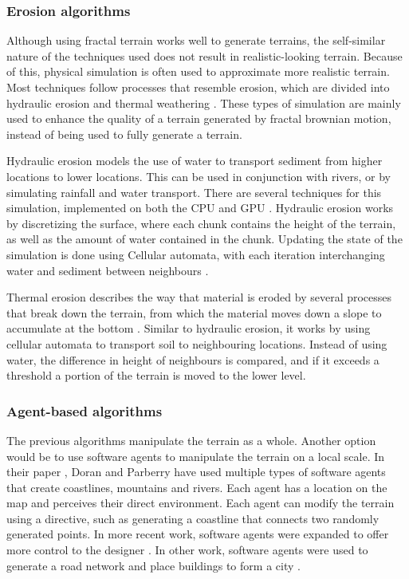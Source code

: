 \documentclass{article}
\begin{document}
\subsubsection{Erosion algorithms}
Although using fractal terrain works well to generate terrains, the self-similar nature of the techniques used does not result in realistic-looking terrain. Because of this, physical simulation is often used to approximate more realistic terrain. Most techniques follow processes that resemble erosion, which are divided into hydraulic erosion and thermal weathering \cite{musgrave_synthesis_1989}. These types of simulation are mainly used to enhance the quality of a terrain generated by fractal brownian motion, instead of being used to fully generate a terrain.

Hydraulic erosion models the use of water to transport sediment from higher locations to lower locations. This can be used in conjunction with rivers, or by simulating rainfall and water transport. There are several techniques for this simulation, implemented on both the CPU and GPU \cite{benes_visual_2002} \cite{stava_interactive_nodate}. Hydraulic erosion works by discretizing the surface, where each chunk contains the height of the terrain, as well as the amount of water contained in the chunk. Updating the state of the simulation is done using Cellular automata, with each iteration interchanging water and sediment between neighbours \cite{dambrosio_cellular_2001}.

Thermal erosion describes the way that material is eroded by several processes that break down the terrain, from which the material moves down a slope to accumulate at the bottom \cite{musgrave_synthesis_1989}. Similar to hydraulic erosion, it works by using cellular automata to transport soil to neighbouring locations. Instead of using water, the difference in height of neighbours is compared, and if it exceeds a threshold a portion of the terrain is moved to the lower level.

\subsubsection{Agent-based algorithms} 
The previous algorithms manipulate the terrain as a whole. Another option would be to use software agents to manipulate the terrain on a local scale. In their paper \cite{doran_controlled_2010}, Doran and Parberry have used multiple types of software agents that create coastlines, mountains and rivers. Each agent has a location on the map and perceives their direct environment. Each agent can modify the terrain using a directive, such as generating a coastline that connects two randomly generated points. In more recent work, software agents were expanded to offer more control to the designer \cite{skold_generating_2023}. In other work, software agents were used to generate a road network and place buildings to form a city \cite{lechner_procedural_2003}.
\end{document}
